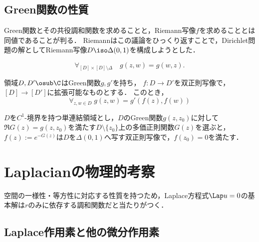 \documentclass[uplatex,dvipdfmx]{jsreport}
\begin{document}
\subsection{Green関数の性質}

\begin{tcolorbox}[colframe=ForestGreen, colback=ForestGreen!10!white,breakable,colbacktitle=ForestGreen!40!white,coltitle=black,fonttitle=\bfseries\sffamily,
title=]
    Green関数とその共役調和関数を求めることと，Riemann写像$f$を求めることとは同値であることが判る．
    Riemannはこの議論をひっくり返すことで，Dirichlet問題の解としてRiemann写像$D\iso\Delta(0,1)$を構成しようとした．
\end{tcolorbox}

\begin{proposition}
    \[\forall_{[D]\times[D]\setminus\Delta}\quad g(z,w)=g(w,z).\]
\end{proposition}

\begin{theorem}
    領域$D,D'\osub\C$はGreen関数$g,g'$を持ち，
    $f:D\to D'$を双正則写像で，$[D]\to[D']$に拡張可能なものとする．
    このとき，
    \[\forall_{z,w\in D}\;g(z,w)=g'(f(z),f(w))\]
\end{theorem}

\begin{theorem}[Green関数を定める正則関数が定めるRiemann写像]
    $D$を$C^1$-境界を持つ単連結領域とし，$D$のGreen関数$g(z,z_0)$に対して$\Re G(z)=g(z,z_0)$を満たす$D\setminus\{z_0\}$上の多価正則関数$G(z)$を選ぶと，
    $f(z):=e^{-G(z)}$は$D$を$\Delta(0,1)$へ写す双正則写像で，$f(z_0)=0$を満たす．
\end{theorem}

\section{Laplacianの物理的考察}

\begin{tcolorbox}[colframe=ForestGreen, colback=ForestGreen!10!white,breakable,colbacktitle=ForestGreen!40!white,coltitle=black,fonttitle=\bfseries\sffamily,
title=]
    空間の一様性・等方性に対応する性質を持つため，Laplace方程式$\Lap u=0$の基本解は$r$のみに依存する調和関数だと当たりがつく．
\end{tcolorbox}

\subsection{Laplace作用素と他の微分作用素}
\end{document}
